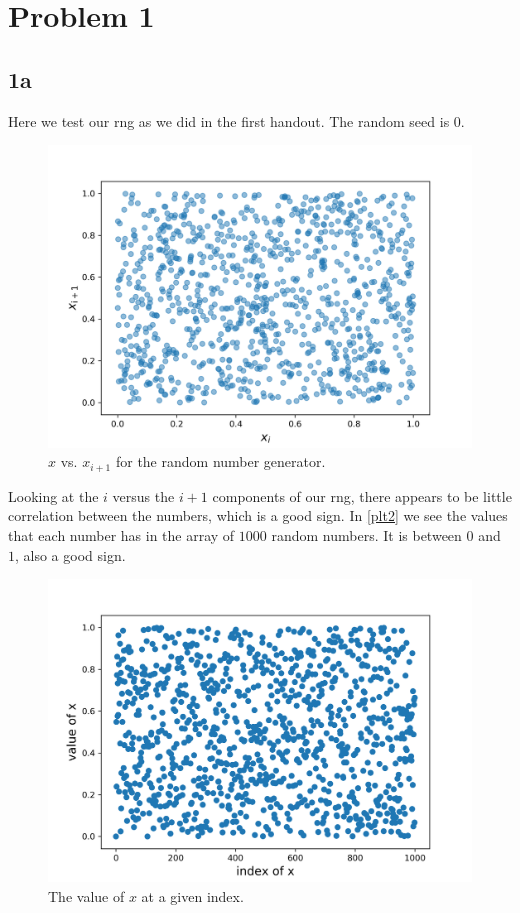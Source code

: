 \section{Problem 1}
\subsection{1a}




Here we test our rng as we did in the first handout. The random seed is $0$. 
\begin{figure}[h!]
    \centering
    \includegraphics[width=0.9\linewidth]{./plots/x_x_1.png}
    \caption{$x$ vs. $x_{i+1}$ for the random number generator.}
    \label{plt1}
\end{figure}
Looking at the $i$ versus the $i+1$ components of our rng, there appears
to be little correlation between the numbers, which is a good sign. In
\autoref{plt2} we see the values that each number has in the array of 
$1000$ random numbers. It is between $0$ and $1$, also a good sign.
\begin{figure}[h!]
    \centering
    \includegraphics[width=0.9\linewidth]{./plots/xval_xind.png}
    \caption{The value of $x$ at a given index.}
    \label{plt2}
\end{figure}
